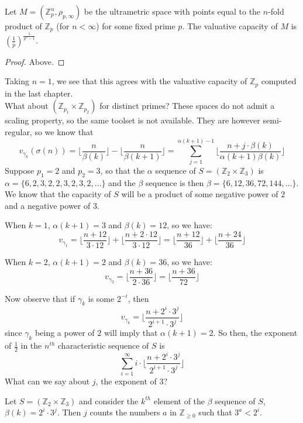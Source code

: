 \begin{proposition*}
Let $M=(\mathbb{Z}_p^n, \rho_{p, \infty})$ be the ultrametric space with points equal to the $n$-fold product of $\mathbb{Z}_p$ (for $n < \infty$) for some fixed prime $p$. The valuative capacity of $M$ is  $(\frac{1}{p})^{\frac{1}{p^n-1}}$.
\end{proposition*}

\begin{proof}
Above.
\end{proof}

Taking $n=1$, we see that this agrees with the valuative capacity of $\mathbb{Z}_p$ computed in the last chapter. \\

What about $(\mathbb{Z}_{p_1} \times \mathbb{Z}_{p_2})$ for distinct primes? These spaces do not admit a scaling property, so the same toolset is not available. They are however semi-regular, so we know that  \[v_{\gamma_k}(\sigma(n)) =  \lfloor\frac{n}{\beta(k)}\rfloor - \lfloor\frac{n}{\beta(k+1)}\rfloor = \sum_{j=1}^{\alpha(k+1)-1} \lfloor \frac{n + j\cdot \beta(k)}{\alpha(k+1)\beta(k)} \rfloor \]
Suppose $p_1 =2$ and $p_2 =3$, so that the $\alpha$ sequence of $S = (\mathbb{Z}_{2} \times \mathbb{Z}_{3})$ is $\alpha = \{6,2,3,2,2,3,2,3,2,\ldots\}$ and the $\beta$ sequence is then $\beta = \{6,12,36,72,144,\ldots\}$. We know that the capacity of $S$ will be a product of some negative power of $2$ and a negative power of $3$. 

When $k=1$, $\alpha(k+1)=3$ and $\beta(k)=12$, so we have:
\[v_{\gamma_1} =  \lfloor \frac{n + 12}{3 \cdot 12} \rfloor + \lfloor \frac{n + 2 \cdot 12}{3 \cdot 12} \rfloor = \lfloor \frac{n + 12}{36} \rfloor + \lfloor \frac{n + 24}{36} \rfloor\]

When $k=2$, $\alpha(k+1)=2$ and $\beta(k)=36$, so we have:
\[v_{\gamma_2} =  \lfloor \frac{n + 36}{2 \cdot 36} \rfloor = \lfloor \frac{n + 36}{72} \rfloor \]

Now observe that if $\gamma_k$ is some $2^{-i}$, then \[v_{\gamma_k} =\lfloor \frac{n + 2^i\cdot 3 ^j}{2^{i+1} \cdot 3^j} \rfloor \] since $\gamma_k$ being a power of $2$ will imply that $\alpha(k+1)=2$. So then, the exponent of $\frac{1}{2}$ in the $n^{th}$ characteristic sequence of $S$ is \[ \sum_{i=1}^\infty i \cdot \lfloor\frac{n + 2^i \cdot 3^j}{2^{i+1}\cdot 3^j} \rfloor\] What can we say about $j$, the exponent of $3$? 

\begin{lemma*}
Let $S = (\mathbb{Z}_{2} \times \mathbb{Z}_{3}) $ and consider the $k^{th}$ element of the $\beta$ sequence of $S$, $\beta(k) = 2^i \cdot 3^j$. Then $j$ counts the numbers $a$ in $\mathbb{Z}_{\geq 0}$ such that $3^a < 2^i$.
\end{lemma*}

